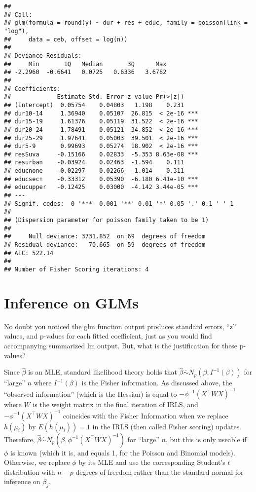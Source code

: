 \documentclass[
]{book}
\begin{document}
\begin{verbatim}
## 
## Call:
## glm(formula = round(y) ~ dur + res + educ, family = poisson(link = "log"), 
##     data = ceb, offset = log(n))
## 
## Deviance Residuals: 
##     Min       1Q   Median       3Q      Max  
## -2.2960  -0.6641   0.0725   0.6336   3.6782  
## 
## Coefficients:
##             Estimate Std. Error z value Pr(>|z|)    
## (Intercept)  0.05754    0.04803   1.198    0.231    
## dur10-14     1.36940    0.05107  26.815  < 2e-16 ***
## dur15-19     1.61376    0.05119  31.522  < 2e-16 ***
## dur20-24     1.78491    0.05121  34.852  < 2e-16 ***
## dur25-29     1.97641    0.05003  39.501  < 2e-16 ***
## dur5-9       0.99693    0.05274  18.902  < 2e-16 ***
## resSuva     -0.15166    0.02833  -5.353 8.63e-08 ***
## resurban    -0.03924    0.02463  -1.594    0.111    
## educnone    -0.02297    0.02266  -1.014    0.311    
## educsec+    -0.33312    0.05390  -6.180 6.41e-10 ***
## educupper   -0.12425    0.03000  -4.142 3.44e-05 ***
## ---
## Signif. codes:  0 '***' 0.001 '**' 0.01 '*' 0.05 '.' 0.1 ' ' 1
## 
## (Dispersion parameter for poisson family taken to be 1)
## 
##     Null deviance: 3731.852  on 69  degrees of freedom
## Residual deviance:   70.665  on 59  degrees of freedom
## AIC: 522.14
## 
## Number of Fisher Scoring iterations: 4
\end{verbatim}

\hypertarget{inference-on-glms}{%
\section{Inference on GLMs}\label{inference-on-glms}}

No doubt you noticed the glm function output produces standard errors, ``z'' values, and p-values for each fitted coefficient, just as you would find accompanying summarized lm output. But, what is the justification for these p-values?

Since \(\hat\beta\) is an MLE, standard likelihood theory holds that \(\hat\beta \stackrel{\cdot}{\sim}N_p(\beta, I^{-1}(\beta))\) for ``large'' \(n\) where \(I^{-1}(\beta)\) is the Fisher information. As discussed above, the ``observed information'' (which is the Hessian) is equal to \(-\phi^{-1}(X^\top WX)^{-1}\) where \(W\) is the weight matrix in the final iteration of IRLS, and \(-\phi^{-1}(X^\top WX)^{-1}\) coincides with the Fisher Information when we replace \(h(\mu_i)\) by \(E(h(\mu_i))=1\) in the IRLS (then called Fisher scoring) updates. Therefore, \(\hat\beta \stackrel{\cdot}{\sim}N_p(\beta, \phi^{-1}(X^\top W X)^{-1})\) for ``large'' \(n\), but this is only useable if \(\phi\) is known (which it is, and equals 1, for the Poisson and Binomial models). Otherwise, we replace \(\phi\) by its MLE and use the corresponding Student's \(t\) distribution with \(n - p\) degrees of freedom rather than the standard normal for inference on \(\beta_j\).
\end{document}
